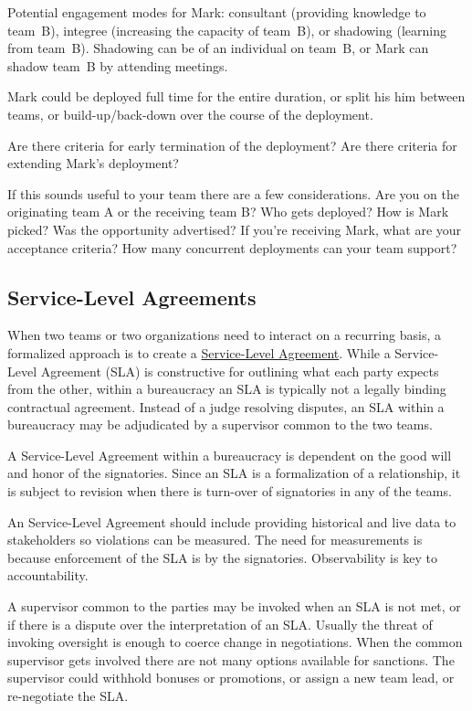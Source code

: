 Potential engagement modes for Mark: consultant (providing knowledge to team~B), integree (increasing the capacity of team~B), or shadowing (learning from team~B). Shadowing can be of an individual on team~B, or Mark can shadow team~B by attending meetings. 


Mark could be deployed full time for the entire duration, or split his him between teams, or build-up/back-down over the course of the deployment.

Are there criteria for early termination of the deployment? Are there criteria for extending Mark's deployment?

If this sounds useful to your team there are a few considerations. Are you on the originating team A or the receiving team B? Who gets deployed? How is Mark picked? Was the opportunity advertised? If you're receiving Mark, what are your acceptance criteria? How many concurrent deployments can your team support?


\subsection*{Service-Level Agreements\label{sec:sla}}

When two teams or two organizations need to interact on a recurring basis, a formalized approach is to create a \href{https://en.wikipedia.org/wiki/Service-level_agreement}{Service-Level Agreement}. 
While a Service-Level Agreement (SLA) is constructive for outlining what each party expects from the other, within a bureaucracy an SLA is typically not a legally binding contractual agreement. Instead of a judge resolving disputes, an SLA within a bureaucracy may be adjudicated by a supervisor common to the two teams.

A Service-Level Agreement within a bureaucracy is dependent on the good will and honor of the signatories. Since an SLA is a formalization of a relationship, it is subject to revision when there is turn-over of signatories in any of the teams. 

An Service-Level Agreement should include providing historical and live data to stakeholders so violations can be measured. The need for measurements is because enforcement of the SLA is by the signatories. Observability is key to accountability. 

A supervisor common to the parties may be invoked when an SLA is not met, or if there is a dispute over the interpretation of an SLA. Usually the threat of invoking oversight is enough to coerce change in negotiations. 
When the common supervisor gets involved there are not many options available for sanctions. The supervisor could withhold bonuses or promotions, or assign a new team lead, or re-negotiate the SLA. 

